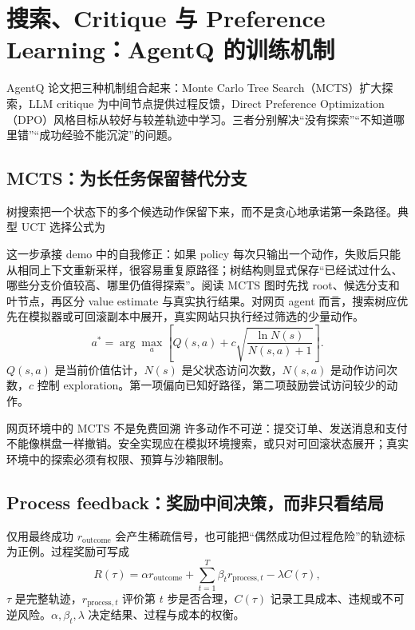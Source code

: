 \section{搜索、Critique 与 Preference Learning：AgentQ 的训练机制}

AgentQ 论文把三种机制组合起来：Monte Carlo Tree Search（MCTS）扩大探索，LLM critique 为中间节点提供过程反馈，Direct Preference Optimization（DPO）风格目标从较好与较差轨迹中学习。三者分别解决“没有探索”“不知道哪里错”“成功经验不能沉淀”的问题。


\subsection{MCTS：为长任务保留替代分支}

树搜索把一个状态下的多个候选动作保留下来，而不是贪心地承诺第一条路径。典型 UCT 选择公式为

这一步承接 demo 中的自我修正：如果 policy 每次只输出一个动作，失败后只能从相同上下文重新采样，很容易重复原路径；树结构则显式保存“已经试过什么、哪些分支价值较高、哪里仍值得探索”。阅读 MCTS 图时先找 root、候选分支和叶节点，再区分 value estimate 与真实执行结果。对网页 agent 而言，搜索树应优先在模拟器或可回滚副本中展开，真实网站只执行经过筛选的少量动作。
\[
a^*=\arg\max_a\left[Q(s,a)+c\sqrt{\frac{\ln N(s)}{N(s,a)+1}}\right].
\]
$Q(s,a)$ 是当前价值估计，$N(s)$ 是父状态访问次数，$N(s,a)$ 是动作访问次数，$c$ 控制 exploration。第一项偏向已知好路径，第二项鼓励尝试访问较少的动作。


\begin{warningbox}{网页环境中的 MCTS 不是免费回溯}
许多动作不可逆：提交订单、发送消息和支付不能像棋盘一样撤销。安全实现应在模拟环境搜索，或只对可回滚状态展开；真实环境中的探索必须有权限、预算与沙箱限制。
\end{warningbox}

\subsection{Process feedback：奖励中间决策，而非只看结局}

仅用最终成功 $r_{\text{outcome}}$ 会产生稀疏信号，也可能把“偶然成功但过程危险”的轨迹标为正例。过程奖励可写成
\[
R(\tau)=\alpha r_{\text{outcome}}+
\sum_{t=1}^{T}\beta_t r_{\text{process},t}-\lambda C(\tau),
\]
$\tau$ 是完整轨迹，$r_{\text{process},t}$ 评价第 $t$ 步是否合理，$C(\tau)$ 记录工具成本、违规或不可逆风险。$\alpha,\beta_t,\lambda$ 决定结果、过程与成本的权衡。

